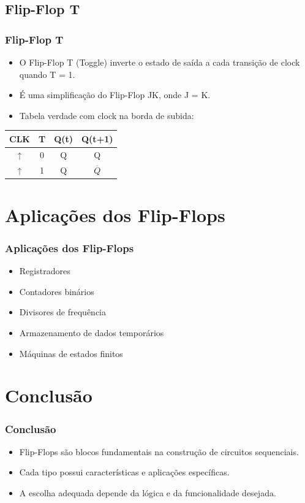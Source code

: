 \documentclass{beamer}
\begin{document}

\subsection{Flip-Flop T}

\begin{frame}
    \frametitle{Flip-Flop T}
    \begin{itemize}
        \item O Flip-Flop T (Toggle) inverte o estado de saída a cada transição de clock quando T = 1.
        \item É uma simplificação do Flip-Flop JK, onde J = K.
        \item Tabela verdade com clock na borda de subida:
    \end{itemize}

    \vspace{0.5em}
    \centering
    \begin{tabular}{|c|c|c|c|}
        \hline
        CLK & T & Q(t) & Q(t+1) \\
        \hline
        ↑ & 0 & Q & Q \\
        ↑ & 1 & Q & $\overline{Q}$ \\
        \hline
    \end{tabular}
\end{frame}

\section{Aplicações dos Flip-Flops}
\begin{frame}
\frametitle{Aplicações dos Flip-Flops}
\begin{itemize}
    \item Registradores
    \item Contadores binários
    \item Divisores de frequência
    \item Armazenamento de dados temporários
    \item Máquinas de estados finitos
\end{itemize}
\end{frame}


\section{Conclusão}
\begin{frame}
\frametitle{Conclusão}
\begin{itemize}
    \item Flip-Flops são blocos fundamentais na construção de circuitos sequenciais.
    \item Cada tipo possui características e aplicações específicas.
    \item A escolha adequada depende da lógica e da funcionalidade desejada.
\end{itemize}
\end{frame}
\end{document}
